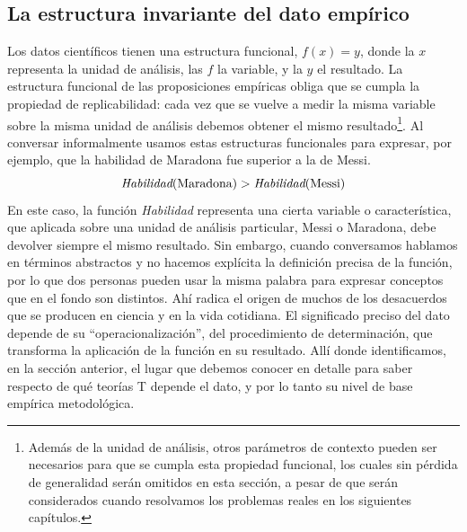\documentclass[a4paper,11pt]{book}
\theoremstyle{definition}
\begin{document}
\subsection{La estructura invariante del dato emp\'irico}

Los datos cient\'ificos tienen una estructura funcional, $f(x)=y$, donde la $x$ representa la unidad de análisis, las $f$ la variable, y la $y$ el resultado.
%
La estructura funcional de las proposiciones emp\'iricas obliga que se cumpla la propiedad de replicabilidad: cada vez que se vuelve a medir la misma variable sobre la misma unidad de análisis debemos obtener el mismo resultado\footnote{Además de la unidad de análisis, otros parámetros de contexto pueden ser necesarios para que se cumpla esta propiedad funcional, los cuales sin pérdida de generalidad serán omitidos en esta secci\'on, a pesar de que serán considerados cuando resolvamos los problemas reales en los siguientes cap\'itulos.}.
%
Al conversar informalmente usamos estas estructuras funcionales para expresar, por ejemplo, que la habilidad de Maradona fue superior a la de Messi.
%
\begin{equation}\label{eq:opiniones}
 \emph{Habilidad}(\text{Maradona}) > \emph{Habilidad}(\text{Messi})
\end{equation}
%
En este caso, la funci\'on \emph{Habilidad} representa una cierta variable o caracter\'istica, que aplicada sobre una unidad de an\'alisis particular, Messi o Maradona, debe devolver siempre el mismo resultado.
%
Sin embargo, cuando conversamos hablamos en términos abstractos y no hacemos expl\'icita la definici\'on precisa de la funci\'on, por lo que dos personas pueden usar la misma palabra para expresar conceptos que en el fondo son distintos.
%
Ah\'i radica el origen de muchos de los desacuerdos que se producen en ciencia y en la vida cotidiana.
%
El significado preciso del dato depende de su ``operacionalizaci\'on'', del procedimiento de determinaci\'on, que transforma la aplicaci\'on de la funci\'on en su resultado.
%
All\'i donde identificamos, en la secci\'on anterior, el lugar que debemos conocer en detalle para saber respecto de qué teor\'ias T depende el dato, y por lo tanto su nivel de base emp\'irica metodol\'ogica.

\end{document}
